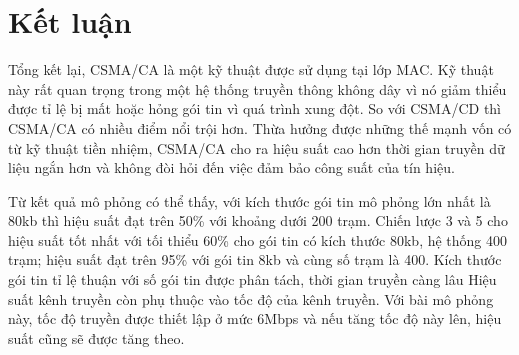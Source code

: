 \chapter{Kết luận}
\label{ch::chapter4}

Tổng kết lại, CSMA/CA là một kỹ thuật được sử dụng tại lớp MAC.
Kỹ thuật này rất quan trọng trong một hệ thống truyền thông không dây vì nó giảm thiểu được tỉ lệ bị mất hoặc hỏng gói tin vì quá trình xung đột.
So với CSMA/CD thì CSMA/CA có nhiều điểm nổi trội hơn. Thừa hưởng được những thế mạnh vốn có từ kỹ thuật tiền nhiệm, CSMA/CA cho ra hiệu suất cao hơn thời gian truyền dữ liệu ngắn hơn và
không đòi hỏi đến việc đảm bảo công suất của tín hiệu.

Từ kết quả mô phỏng có thể thấy, với kích thước gói tin mô phỏng lớn nhất là 80kb thì hiệu suất đạt trên 50\% với khoảng dưới 200 trạm.
Chiến lược 3 và 5 cho hiệu suất tốt nhất với tối thiểu 60\% cho gói tin có kích thước 80kb, hệ thống 400 trạm; hiệu suất đạt trên 95\% với gói tin 8kb và cùng số trạm là 400.
Kích thước gói tin tỉ lệ thuận với số gói tin được phân tách, thời gian truyền càng lâu
Hiệu suất kênh truyền còn phụ thuộc vào tốc độ của kênh truyền. Với bài mô phỏng này, tốc độ truyền được thiết lập ở mức 6Mbps và nếu tăng tốc độ này lên, hiệu suất cũng sẽ được tăng theo.
